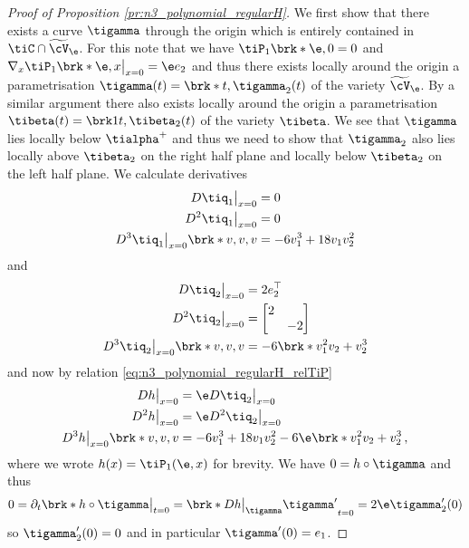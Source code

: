 \begin{proof}[Proof of Proposition \ref{pr:n3_polynomial_regularH}]
  We first show that there exists a curve $\tigamma$ through the origin which is
  entirely contained in $\tiC\cap \widetilde{\cV}_\e$.
  For this note that we have $\tiP_1\brk*{\e,0}=0$ and $\nabla_x\tiP_1\brk*{\e,x}\big\vert_{x=0}=\e e_2$
  and thus there exists locally around the origin a parametrisation $\tigamma(t)=\brk*{t,\tigamma_2(t)}$
  of the variety $\widetilde{\cV}_\e$.
  By a similar argument there also exists locally around the origin  a parametrisation $\tibeta(t)=\brk1{t,\tibeta_2(t)}$ of the variety $\tibeta$.
  We see that $\tigamma$ lies locally below $\tialpha^+$ and thus we need to show that $\tigamma_2$ also lies locally
  above $\tibeta_2$ on the right half plane and locally below $\tibeta_2$ on the left half plane.
  We calculate derivatives
  \begin{align*}
    D\tiq_1\big\vert_{x=0}&=0 \\
    D^2\tiq_1\big\vert_{x=0}&=0 \\
    D^3\tiq_1\big\vert_{x=0}\brk*{v,v,v}&=-6v_1^3+18v_1v_2^2
  \end{align*}
  and
  \begin{align*}
    D\tiq_2\big\vert_{x=0}&=2e_2^\top\\
    D^2\tiq_2\big\vert_{x=0}&=\begin{bmatrix}
      2&\\
      &-2
    \end{bmatrix} \\
	    D^3\tiq_2\big\vert_{x=0}\brk*{v,v,v}&=-6\brk*{v_1^2v_2+v_2^3}
  \end{align*}
  and now by relation \eqref{eq:n3_polynomial_regularH_relTiP}
  \begin{align}
    \begin{aligned}
	    Dh\big\vert_{x=0}&=\e D\tiq_2\big\vert_{x=0}\\
	    D^2h\big\vert_{x=0}&=\e D^2\tiq_2\big\vert_{x=0} \\
    D^3h\big\vert_{x=0}\brk*{v,v,v}&=-6v_1^3+18v_1v_2^2-6\e\brk*{v_1^2v_2+v_2^3}\,,
    \end{aligned}
    \label{eq:n3_polynomial_regularH_DPDq}
  \end{align}
  where we wrote $h(x)=\tiP_1(\e,x)$ for brevity. We have $0=h\circ\tigamma$ and thus
  \begin{align}
    0=\partial_t\brk*{h\circ\tigamma}\big\vert_{t=0}=\brk*{Dh\big\vert_{\tigamma}\tigamma'}_{t=0}
    =2\e\tigamma_2'(0)\label{eq:n3_polynomial_regularH_gammaDer1}
  \end{align}
  so $\tigamma_2'(0)=0$ and in particular $\tigamma'(0)=e_1$.

\end{proof}

